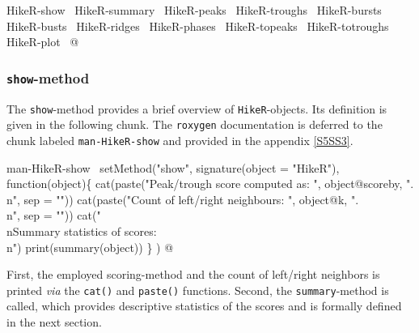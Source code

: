 \documentclass[a4paper]{article}
\begin{document}
\nwenddocs{}\endmoddef\let\nwnotused=\nwoutput{}
\LA{}HikeR-show~{\nwtagstyle{}}\RA{}
\LA{}HikeR-summary~{\nwtagstyle{}}\RA{}
\LA{}HikeR-peaks~{\nwtagstyle{}}\RA{}
\LA{}HikeR-troughs~{\nwtagstyle{}}\RA{}
\LA{}HikeR-bursts~{\nwtagstyle{}}\RA{}
\LA{}HikeR-busts~{\nwtagstyle{}}\RA{}
\LA{}HikeR-ridges~{\nwtagstyle{}}\RA{}
\LA{}HikeR-phases~{\nwtagstyle{}}\RA{}
\LA{}HikeR-topeaks~{\nwtagstyle{}}\RA{}
\LA{}HikeR-totroughs~{\nwtagstyle{}}\RA{}
\LA{}HikeR-plot~{\nwtagstyle{}}\RA{}
\nwnotused{HikerMethods.R}\nwendcode{}@

\subsubsection{\texttt{show}-method}
The \verb?show?-method provides a brief overview of
\verb?HikeR?-objects. Its definition is given in the following chunk. The
\verb?roxygen? documentation is deferred to the chunk labeled
\verb?man-HikeR-show? and provided in the appendix \ref{S5SS3}.

\nwenddocs{}\endmoddef
\LA{}man-HikeR-show~{\nwtagstyle{}}\RA{}
setMethod("show",
          signature(object = "HikeR"), function(object)\{
              cat(paste("Peak/trough score computed as: ",
                        object@scoreby, ".\\n", sep = ""))
              cat(paste("Count of left/right neighbours: ", object@k,
                        ".\\n", sep = ""))
              cat("\\nSummary statistics of scores:\\n")
              print(summary(object))
          \}
)
\nwendcode{}@

First, the employed scoring-method and the count of left/right
neighbors is printed \emph{via} the \verb?cat()? and \verb?paste()?
functions. Second, the \verb?summary?-method is called, which provides
descriptive statistics of the scores and is formally defined in the
next section.
\end{document}
